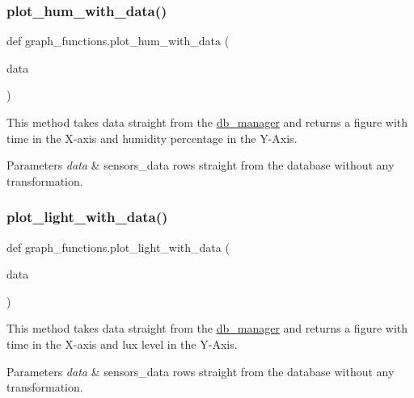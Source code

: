 \subsubsection{\texorpdfstring{plot\+\_\+hum\+\_\+with\+\_\+data()}{plot\_hum\_with\_data()}}
{\footnotesize\ttfamily def graph\+\_\+functions.\+plot\+\_\+hum\+\_\+with\+\_\+data (\begin{DoxyParamCaption}\item[{}]{data }\end{DoxyParamCaption})}



This method takes data straight from the \textquotesingle{}\hyperlink{namespacedb__manager}{db\+\_\+manager}\textquotesingle{} and returns a figure with time in the X-\/axis and humidity percentage in the Y-\/\+Axis. 


\begin{DoxyParams}{Parameters}
{\em data} & \textquotesingle{}sensors\+\_\+data\textquotesingle{} rows straight from the database without any transformation. \\
\hline
\end{DoxyParams}
\mbox{\label{namespacegraph__functions_a04abf299e8d2fc1d54f6fc7ec5b73ed0}} 
\subsubsection{\texorpdfstring{plot\+\_\+light\+\_\+with\+\_\+data()}{plot\_light\_with\_data()}}
{\footnotesize\ttfamily def graph\+\_\+functions.\+plot\+\_\+light\+\_\+with\+\_\+data (\begin{DoxyParamCaption}\item[{}]{data }\end{DoxyParamCaption})}



This method takes data straight from the \textquotesingle{}\hyperlink{namespacedb__manager}{db\+\_\+manager}\textquotesingle{} and returns a figure with time in the X-\/axis and lux level in the Y-\/\+Axis. 


\begin{DoxyParams}{Parameters}
{\em data} & \textquotesingle{}sensors\+\_\+data\textquotesingle{} rows straight from the database without any transformation. \\
\hline
\end{DoxyParams}
\mbox{\label{namespacegraph__functions_a9d595169f9bb4cb9f6d8b9d2cd4ebc34}} 
